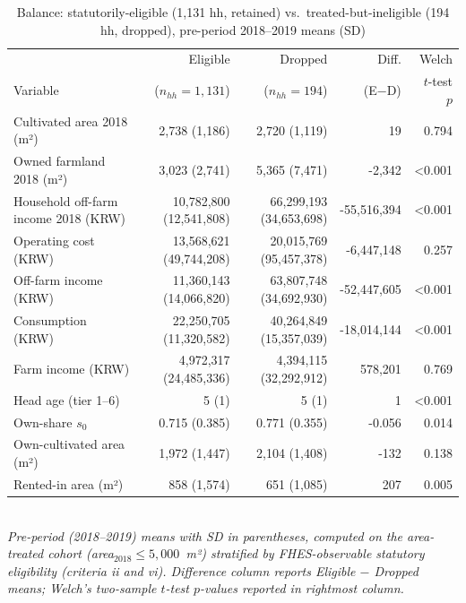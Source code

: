 \begin{table}[ht]
\centering
\caption{Balance: statutorily-eligible (1,131 hh, retained) vs.\ treated-but-ineligible (194 hh, dropped), pre-period 2018--2019 means (SD)}
\label{tab:dropped-balance}
\scriptsize
\setlength{\tabcolsep}{4pt}
\begin{tabular}{lrrrr}
\toprule
 & Eligible & Dropped & Diff. & Welch \\
Variable & ($n_{hh}=1{,}131$) & ($n_{hh}=194$) & (E$-$D) & $t$-test $p$ \\
\midrule
Cultivated area 2018 (m²) & 2,738 (1,186) & 2,720 (1,119) & 19 & 0.794 \\
Owned farmland 2018 (m²) & 3,023 (2,741) & 5,365 (7,471) & -2,342 & <0.001 \\
Household off-farm income 2018 (KRW) & 10,782,800 (12,541,808) & 66,299,193 (34,653,698) & -55,516,394 & <0.001 \\
Operating cost (KRW) & 13,568,621 (49,744,208) & 20,015,769 (95,457,378) & -6,447,148 & 0.257 \\
Off-farm income (KRW) & 11,360,143 (14,066,820) & 63,807,748 (34,692,930) & -52,447,605 & <0.001 \\
Consumption (KRW) & 22,250,705 (11,320,582) & 40,264,849 (15,357,039) & -18,014,144 & <0.001 \\
Farm income (KRW) & 4,972,317 (24,485,336) & 4,394,115 (32,292,912) & 578,201 & 0.769 \\
Head age (tier 1--6) & 5 (1) & 5 (1) & 1 & <0.001 \\
Own-share $s_0$ & 0.715 (0.385) & 0.771 (0.355) & -0.056 & 0.014 \\
Own-cultivated area (m²) & 1,972 (1,447) & 2,104 (1,408) & -132 & 0.138 \\
Rented-in area (m²) & 858 (1,574) & 651 (1,085) & 207 & 0.005 \\
\bottomrule
\end{tabular}
\\
\footnotesize\textit{Pre-period (2018--2019) means with SD in parentheses, computed on the area-treated cohort (area$_{2018}\le 5{,}000$~m²) stratified by FHES-observable statutory eligibility (criteria ii and vi). Difference column reports Eligible $-$ Dropped means; Welch's two-sample $t$-test $p$-values reported in rightmost column.}
\end{table}

